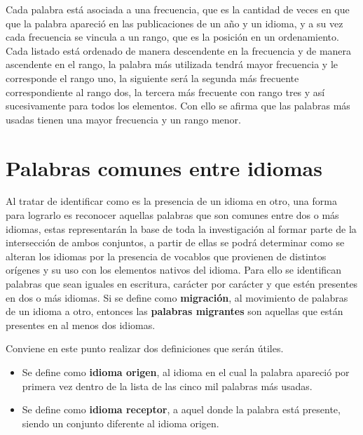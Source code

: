 Cada palabra está asociada a una frecuencia, que es la cantidad de veces en que
que la  palabra apareció en las publicaciones de un año y un idioma, y a su vez
cada frecuencia se vincula a un rango, que es la posición en un ordenamiento.
Cada listado está ordenado de manera descendente en la frecuencia y de manera
ascendente en el rango, la palabra más utilizada tendrá mayor frecuencia y le
corresponde el rango uno,  la siguiente será la segunda más frecuente
correspondiente al rango dos,  la tercera más frecuente con rango tres y así
sucesivamente para todos los elementos.  Con ello se afirma que las palabras
más usadas tienen una mayor frecuencia y un rango menor. 

\section{Palabras comunes entre idiomas}

Al tratar de identificar como es la presencia de un idioma en otro, una forma para lograrlo es reconocer aquellas palabras que son comunes entre dos o más idiomas,  estas representarán la base de toda la investigación
al formar parte de la intersección de ambos conjuntos, a partir de ellas se podrá determinar como se alteran los idiomas por la presencia de vocablos que provienen de distintos orígenes y su uso con los elementos nativos del idioma.  Para ello se identifican palabras que sean iguales en escritura, carácter por carácter y que estén presentes en dos o más idiomas.  Si se define como
\textbf{migración}, al movimiento de palabras de un idioma a otro, entonces las
\textbf{palabras migrantes}  son aquellas que están presentes en al
menos dos idiomas.  

Conviene en este punto realizar dos definiciones que serán
útiles.
{}


\begin{itemize}
\item 
Se define como  \textbf{idioma origen}, al idioma en el cual la palabra
apareció por primera vez dentro de la lista de las cinco mil palabras más
usadas.  

\item 
Se define como \textbf{idioma receptor}, a  aquel donde la palabra está
presente, siendo un conjunto diferente al idioma origen.  
\end{itemize}

